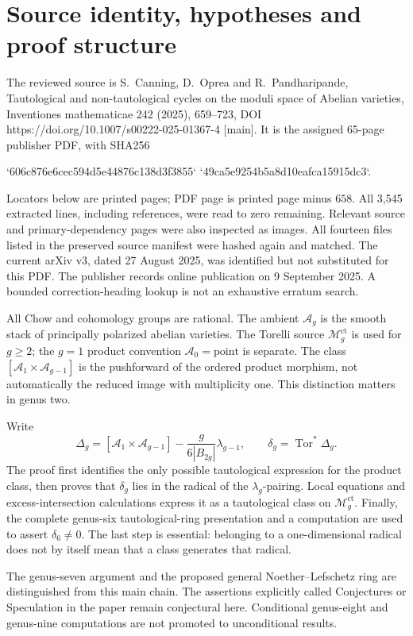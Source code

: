 \documentclass[10pt]{article}
\begin{document}
\section*{Source identity, hypotheses and proof structure}
The reviewed source is S. Canning, D. Oprea and R. Pandharipande, Tautological and non-tautological cycles on the moduli space of Abelian varieties, Inventiones mathematicae 242 (2025), 659–723, DOI https://doi.org/10.1007/s00222-025-01367-4 [main]. It is the assigned 65-page publisher PDF, with SHA256\par
`606c876e6cec594d5e44876c138d3f3855`
`49ca5e9254b5a8d10eafca15915dc3`.\par
Locators below are printed pages; PDF page is printed page minus \(658\). All 3,545 extracted lines, including references, were read to zero remaining. Relevant source and primary-dependency pages were also inspected as images. All fourteen files listed in the preserved source manifest were hashed again and matched. The current arXiv v3, dated 27 August 2025, was identified but not substituted for this PDF. The publisher records online publication on 9 September 2025. A bounded correction-heading lookup is not an exhaustive erratum search.\par
All Chow and cohomology groups are rational. The ambient \(\mathcal A_g\) is the smooth stack of principally polarized abelian varieties. The Torelli source \(\mathcal M_g^\mathrm{ct}\) is used for \(g\ge2\); the \(g=1\) product convention \(\mathcal A_0=\mathrm{point}\) is separate. The class \([\mathcal A_1\times\mathcal A_{g-1}]\) is the pushforward of the ordered product morphism, not automatically the reduced image with multiplicity one. This distinction matters in genus two.\par
Write \[\Delta_g=[\mathcal A_1\times\mathcal A_{g-1}]
       -\frac{g}{6|B_{2g}|}\lambda_{g-1},
 \qquad \delta_g=\operatorname{Tor}^*\Delta_g.\] The proof first identifies the only possible tautological expression for the product class, then proves that \(\delta_g\) lies in the radical of the \(\lambda_g\)-pairing. Local equations and excess-intersection calculations express it as a tautological class on \(\mathcal M_g^\mathrm{ct}\). Finally, the complete genus-six tautological-ring presentation and a computation are used to assert \(\delta_6\ne0\). The last step is essential: belonging to a one-dimensional radical does not by itself mean that a class generates that radical.\par
The genus-seven argument and the proposed general Noether–Lefschetz ring are distinguished from this main chain. The assertions explicitly called Conjectures or Speculation in the paper remain conjectural here. Conditional genus-eight and genus-nine computations are not promoted to unconditional results.\par
\end{document}
